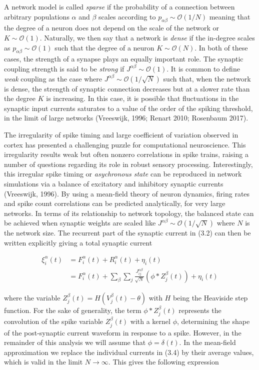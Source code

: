 \documentclass{ucetd}
\begin{document}
A network model is called \emph{sparse} if the probability of a connection between arbitrary populations $\alpha$ and $\beta$ scales according to $p_{\alpha\beta} \sim \mathcal{O}(1/N)$ meaning that the degree of a neuron does not depend on the scale of the network or $K \sim \mathcal{O}(1)$. Naturally, we then say that a network is \emph{dense} if the in-degree scales as $p_{\alpha\beta} \sim \mathcal{O}(1)$ such that the degree of a neuron $K \sim \mathcal{O}(N)$. In both of these cases, the strength of a synapse plays an equally important role. The synaptic coupling strength is said to be \emph{strong} if $J^{\alpha\beta} \sim \mathcal{O}(1)$. It is common to define \emph{weak} coupling as the case where $J^{\alpha\beta} \sim \mathcal{O}(1/\sqrt{N})$ such that, when the network is dense, the strength of synaptic connection decreases but at a slower rate than the degree $K$ is increasing. In this case, it is possible that fluctuations in the synaptic input currents saturates to a value of the order of the spiking threshold, in the limit of large networks (Vreeswijk, 1996; Renart 2010; Rosenbaum 2017).

The irregularity of spike timing and large coefficient of variation observed in cortex has presented a challenging puzzle for computational neuroscience. This irregularity results weak but often nonzero correlations in spike trains, raising a number of questions regarding its role in robust sensory processing. Interestingly, this irregular spike timing or \emph{asychronous state} can be reproduced in network simulations via a balance of excitatory and inhibitory synaptic currents (Vreeswijk, 1996). By using a mean-field theory of neuron dynamics, firing rates and spike count correlations can be predicted analytically, for very large networks. In terms of its relationship to network topology, the balanced state can be achieved when synaptic weights are scaled like $J^{\alpha\beta} \sim \mathcal{O}(1/\sqrt{N})$ where $N$ is the network size. The recurrent part of the synaptic current in (3.2) can then be written explicitly giving a total synaptic current

\begin{align}
\xi_{i}^{\alpha}(t) &= F_{i}^{\alpha}(t) + R_{i}^{\alpha}(t) + \eta_{i}(t)\\
&= F_{i}^{\alpha}(t) + \sum_{\beta}\sum_{j} \frac{J_{ij}^{\alpha\beta}}{\sqrt{N}}(\phi * Z^{\beta}_{j}(t)) + \eta_{i}(t)
\end{align}

where the variable $Z^{\beta}_{j}(t) = H(V^{\beta}_{j}(t) - \theta)$ with $H$ being the Heaviside step function. For the sake of generality, the term $\phi * Z^{\beta}_{j}(t)$ represents the convolution of the spike variable $Z^{\beta}_{j}(t)$ with a kernel $\phi$, determining the shape of the post-synaptic current waveform in response to a spike. However, in the remainder of this analysis we will assume that $\phi = \delta(t)$. In the mean-field approximation we replace the individual currents in (3.4) by their average values, which is valid in the limit $N\rightarrow\infty$. This gives the following expression
\end{document}
